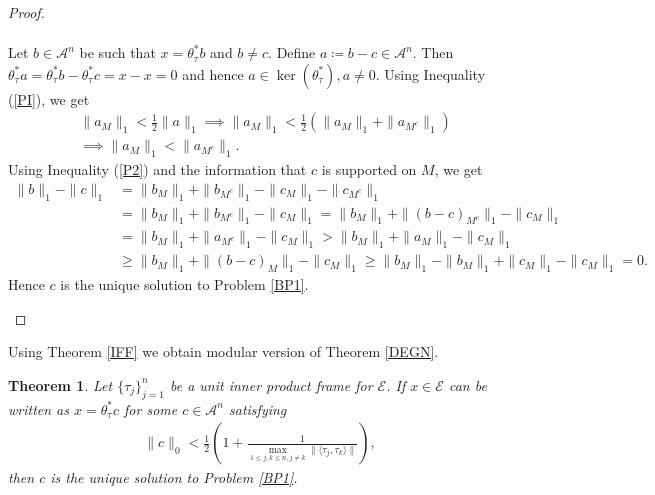 \documentclass{amsart}
\newtheorem{theorem}{Theorem}[section]
\begin{document}
\begin{proof}
\begin{enumerate}[\upshape(i)]
\begin{align}
\end{align}
Let $b\in \mathcal{A}^n$ be such that $x=\theta_\tau^* b$ and $b\neq c$. Define $a\coloneqq b-c \in \mathcal{A}^n$. Then $\theta_\tau^* a=\theta_\tau^* b-\theta_\tau^* c=x-x=0$  and hence $a \in \ker(\theta_\tau^*), a \neq 0$. Using Inequality (\ref{PI}), we get 
\begin{align}\label{P2}
	&\|a_M\|_1<\frac{1}{2}\|a\|_1 \implies \|a_M\|_1<\frac{1}{2}(\|a_{M}\|_1+\|a_{M^c}\|_1) \nonumber \\
	&\implies \|a_M\|_1<\|a_{M^c}\|_1.
\end{align}
Using Inequality (\ref{P2}) and the information that $c$ is supported on $M$, we get 
\begin{align*}
\|b\|_1-\|c\|_1&=\|b_M\|_1+\|b_{M^c}\|_1-\|c_M\|_1-\|c_{M^c}\|_1\\
&=\|b_M\|_1+\|b_{M^c}\|_1-\|c_M\|_1=\|b_M\|_1+\|(b-c)_{M^c}\|_1-\|c_M\|_1\\
&=\|b_M\|_1+\|a_{M^c}\|_1-\|c_M\|_1>\|b_M\|_1+\|a_M\|_1-\|c_M\|_1\\
&\geq \|b_M\|_1+\|(b-c)_M\|_1-\|c_M\|_1\geq \|b_M\|_1-\|b_M\|_1+\|c_M\|_1-\|c_M\|_1= 0.
\end{align*}
Hence $c$ is the unique solution to Problem \ref{BP1}.
\end{enumerate}	
\end{proof}
Using Theorem \ref{IFF} we obtain modular version of Theorem \ref{DEGN}.
\begin{theorem}\label{TDP}
Let  $\{\tau_j\}_{j=1}^n $  be a unit inner product frame for  $\mathcal{E}$.	If $x \in \mathcal{E}$ can be written as  $	x=\theta_\tau^* c$ for some  $c \in \mathcal{A}^n$ satisfying 
\begin{align}\label{I}
\|c\|_0<\frac{1}{2}\left(1+\frac{1}{\displaystyle\max_{1\leq j, k \leq n, j\neq k}\|\langle \tau_j, \tau_k\rangle\|}\right),	
\end{align}
then $c$ is the unique solution to Problem \ref{BP1}.
\end{theorem}
\end{document}
